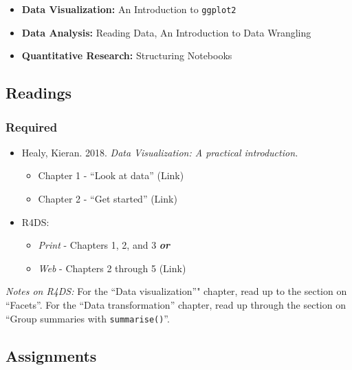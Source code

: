 \documentclass[]{book}
\providecommand{\tightlist}{%
  \setlength{\itemsep}{0pt}\setlength{\parskip}{0pt}}
\theoremstyle{definition}
\theoremstyle{definition}
\theoremstyle{definition}
\theoremstyle{remark}
\begin{document}
\begin{itemize}
\tightlist
\item
  \textbf{Data Visualization:} An Introduction to \texttt{ggplot2}
\item
  \textbf{Data Analysis:} Reading Data, An Introduction to Data
  Wrangling
\item
  \textbf{Quantitative Research:} Structuring Notebooks
\end{itemize}

\hypertarget{readings-3}{%
\subsection*{Readings}\label{readings-3}}

\hypertarget{required-3}{%
\subsubsection*{Required}\label{required-3}}

\begin{itemize}
\tightlist
\item
  Healy, Kieran. 2018. \emph{Data Visualization: A practical
  introduction.}

  \begin{itemize}
  \tightlist
  \item
    Chapter 1 - ``Look at data'' (Link)
  \item
    Chapter 2 - ``Get started'' (Link)
  \end{itemize}
\item
  R4DS:

  \begin{itemize}
  \tightlist
  \item
    \emph{Print} - Chapters 1, 2, and 3 \textbf{\emph{or}}
  \item
    \emph{Web} - Chapters 2 through 5 (Link)
  \end{itemize}
\end{itemize}

\emph{Notes on R4DS:} For the ``Data visualization''" chapter, read up
to the section on ``Facets''. For the ``Data transformation'' chapter,
read up through the section on ``Group summaries with
\texttt{summarise()}''.

\hypertarget{assignments-3}{%
\subsection*{Assignments}\label{assignments-3}}
\end{document}
